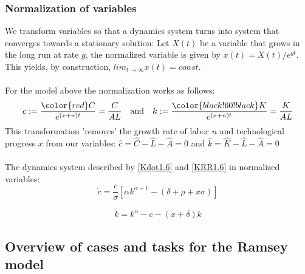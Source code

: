 \subsubsection{Normalization of variables}
We transform variables so that a dynamics system turns into system that converges towards a stationary solution:
 Let $X(t)$ be a variable that grows in the long run at rate $g$, the normalized variable is given by $x(t)=X(t)/e^{gt}$. This yields, by construction, $lim_{t\to\infty}x(t)=const.$\\\\
For the model above the normalization works as follows: 
$$c : = \frac{\color{red}C}{e^{(x+n)t}} = \frac{C}{AL} \quad \text{and} \quad k := \frac{\color{black!60!black}K}{e^{(x+n)t}} = \frac{K}{AL}$$
This transformation 'removes' the growth rate of labor $n$ and technological progress $x$ from our variables: $\hat{c}=\hat{C}-\hat{L}-\hat{A}=0$ and  $\hat{k}=\hat{K}-\hat{L}-\hat{A}=0$\\\\
The dynamics system described by \eqref{Kdot1.6} and \eqref{KRR1.6} in normalized variables: 
$$\dot{c} = \frac{c}{\sigma} \left[ \alpha k^{\alpha-1} - (\delta + \rho + x \sigma) \right]$$

$$\dot{k} = k^{\alpha} - c - (x + \delta)k$$





\subsection{Overview of cases and tasks for the Ramsey model}
\renewcommand{\arraystretch}{1.4} %
\setlength{\tabcolsep}{10pt}     %
\setlength{\arrayrulewidth}{0.4pt} %


